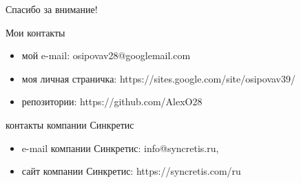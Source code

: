 \documentclass{beamer}
\begin{document}
\begin{frame}{Спасибо за внимание!}

\begin{block}{Мои контакты}
\begin{itemize}
	\item мой e-mail: osipovav28@googlemail.com
	\item моя личная страничка: https://sites.google.com/site/osipovav39/
	\item репозитории: https://github.com/AlexO28
\end{itemize}
\end{block}
\begin{block}{контакты компании Синкретис}
\begin{itemize}
	\item e-mail компании Синкретис: info@syncretis.ru,
	\item сайт компании Синкретис: https://syncretis.com/ru
\end{itemize}
\end{block}

\end{frame}
\end{document}

